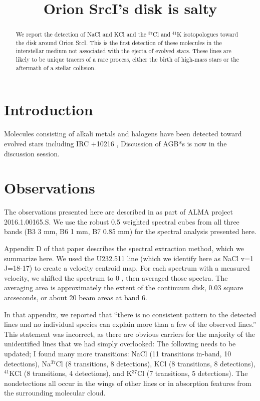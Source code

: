 \documentclass[twocolumn]{aastex62}
\newcommand{\sourcei}{SrcI\xspace}
\begin{document}


\title{Orion \sourcei's disk is salty}
\begin{abstract}
    We report the detection of NaCl and KCl and the $^{37}$Cl and $^{41}$K
    isotopologues toward the disk around Orion \sourcei.
    This is the first detection of these molecules in the interstellar
    medium not associated with the ejecta of evolved stars.
    These lines are likely to be unique tracers of a rare process, either
    the birth of high-mass stars or the aftermath of a stellar collision.
\end{abstract}

\section{Introduction}
Molecules consisting of alkali metals and halogens have been detected
toward evolved stars including IRC +10216 \citep{Cernicharo1987a}, 
{\color{red}Discussion of AGB*s is now in the discussion session.}

\section{Observations}
The observations presented here are described in \citet{Ginsburg2018a} as part
of ALMA project 2016.1.00165.S.  We use the robust 0.5 weighted spectral cubes
from all three bands (B3 3 mm, B6 1 mm, B7 0.85 mm) for the spectral analysis
presented here.

Appendix D of that paper describes the spectral extraction method,
which we summarize here.  We used the U232.511 line (which we identify here as
NaCl v=1 J=18-17) to create a velocity centroid map.  For each spectrum with
a measured velocity, we shifted the spectrum to 0 \kms, then averaged those
spectra.  The averaging area is approximately the extent of the continuum
disk, 0.03 square arcseconds, or about 20 beam areas at band 6.

In that appendix, we reported that ``there is no consistent pattern to the
detected lines and no individual species can explain more than a few of the
observed lines.''  This statement was incorrect, as there are obvious carriers
for the majority of the unidentified lines that we had simply overlooked:
{\color{red}The following needs to be updated; I found many more transitions:}
NaCl (11 transitions in-band, 10 detections), Na$^{37}$Cl (8 transitions, 8
detections), KCl (8 transitions, 8 detections), $^{41}$KCl (8 transitions, 4
detections), and K$^{37}$Cl (7 transitions, 5 detections).
The nondetections all occur in the wings of other lines or in absorption
features from the surrounding molecular cloud.
\end{document}
